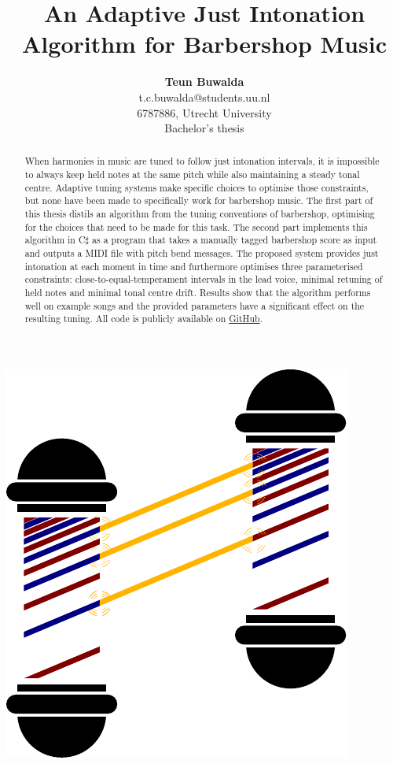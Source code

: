 \documentclass[a4paper]{article}
\title{An Adaptive Just Intonation Algorithm for Barbershop Music}
\author{{\bf Teun Buwalda}\\t.c.buwalda@students.uu.nl\\6787886, Utrecht University\\Bachelor's thesis}
\begin{document}

\begin{titlepage}

\begin{center}
	\includegraphics[height=0.3\textheight]{Figures/poles_logo.pdf}
\end{center}

\vspace{-15pt}

{
	\let\newpage\relax
	\maketitle
}

\begin{abstract}
	When harmonies in music are tuned to follow just intonation intervals, it is impossible to always keep held notes at the same pitch while also maintaining a steady tonal centre. Adaptive tuning systems make specific choices to optimise those constraints, but none have been made to specifically work for barbershop music. The first part of this thesis distils an algorithm from the tuning conventions of barbershop, optimising for the choices that need to be made for this task. The second part implements this algorithm in C$\sharp$ as a program that takes a manually tagged barbershop score as input and outputs a MIDI file with pitch bend messages. The proposed system provides just intonation at each moment in time and furthermore optimises three parameterised constraints: close-to-equal-temperament intervals in the lead voice, minimal retuning of held notes and minimal tonal centre drift. Results show that the algorithm performs well on example songs and the provided parameters have a significant effect on the resulting tuning. All code is publicly available on \href{https://GitHub.com/teuncb/AdaptiveBarbershop}{GitHub}.
\end{abstract}


\end{titlepage}
\end{document}

